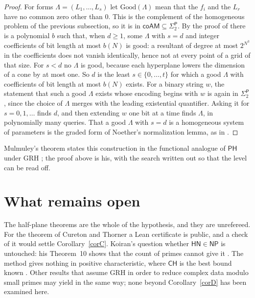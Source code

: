 \documentclass[11pt]{amsart}
\theoremstyle{definition}
\theoremstyle{remark}
\newcommand{\cl}[1]{\mathsf{#1}}
\newcommand{\HN}{\cl{HN}}
\newcommand{\Sigtwo}{\Sigma_2^{\cl P}}
\begin{document}
\begin{proof}
For forms $\Lambda=(L_1,\dots,L_s)$ let $\mathrm{Good}(\Lambda)$ mean that the $f_i$ and the $L_r$ have no common zero other than $0$. This is the complement of the homogeneous problem of the previous subsection, so it is in $\cl{coAM}\subseteq\Sigtwo$. By the proof of \cite[Theorem~3.4, pp.~27--28]{M17} there is a polynomial $b$ such that, when $d\ge1$, some $\Lambda$ with $s=d$ and integer coefficients of bit length at most $b(N)$ is good: a resultant of degree at most $2^{N^3}$ in the coefficients does not vanish identically, hence not at every point of a grid of that size. For $s<d$ no $\Lambda$ is good, because each hyperplane lowers the dimension of a cone by at most one. So $d$ is the least $s\in\{0,\dots,t\}$ for which a good $\Lambda$ with coefficients of bit length at most $b(N)$ exists. For a binary string $w$, the statement that such a good $\Lambda$ exists whose encoding begins with $w$ is again in $\Sigtwo$, since the choice of $\Lambda$ merges with the leading existential quantifier. Asking it for $s=0,1,\dots$ finds $d$, and then extending $w$ one bit at a time finds $\Lambda$, in polynomially many queries. That a good $\Lambda$ with $s=d$ is a homogeneous system of parameters is the graded form of Noether's normalization lemma, as in \cite[Lemma~3.2 and proof of Theorem~3.4]{M17}.
\end{proof}

Mulmuley's theorem states this construction in the functional analogue of $\cl{PH}$ under GRH \cite[Theorem~3.4]{M17}; the proof above is his, with the search written out so that the level can be read off.

\section{What remains open}
The half-plane theorems are the whole of the hypothesis, and they are unrefereed. For the theorem of Cureton and Thorner a Lean certificate is public, and a check of it would settle Corollary~\ref{corC}. Koiran's question whether $\HN\in\cl{NP}$ is untouched: his Theorem~10 shows that the count of primes cannot give it \cite[\S6]{K96}. The method gives nothing in positive characteristic, where $\cl{CH}$ is the best bound known \cite{AGS}. Other results that assume GRH in order to reduce complex data modulo small primes may yield in the same way; none beyond Corollary~\ref{corD} has been examined here.
\end{document}
